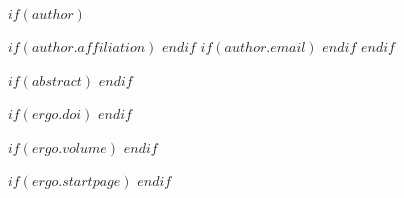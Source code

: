 $if(author)$
\author{$author.name$}
$if(author.affiliation)$
$endif$
$if(author.email)$
$endif$
$endif$

$if(abstract)$
%
$endif$

$if(ergo.doi)$
$endif$

$if(ergo.volume)$
%
$endif$

$if(ergo.startpage)$
\setcounter{page}{$ergo.startpage$}%
$endif$
